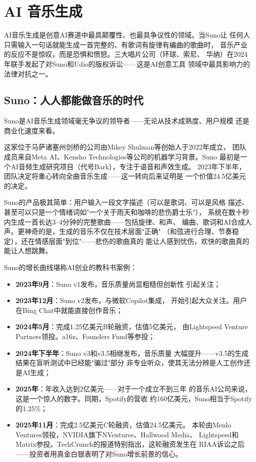 \section{AI 音乐生成}
\label{sec:create-music}

AI音乐生成是创意AI赛道中最具颠覆性、也最具争议性的领域。当Suno让
任何人只需输入一句话就能生成一首完整的、有歌词有旋律有编曲的歌曲时，
音乐产业的反应不是惊叹，而是恐惧和愤怒。三大唱片公司（环球、索尼、
华纳）在2024年联手发起了对Suno和Udio的版权诉讼——这是AI创意工具
领域中最具影响力的法律对抗之一。

\subsection{Suno：人人都能做音乐的时代}
\label{subsec:suno}

Suno是AI音乐生成领域毫无争议的领导者——无论从技术成熟度、用户规模
还是商业化速度来看。

这家位于马萨诸塞州剑桥的公司由Mikey Shulman等创始人于2022年成立，
团队成员来自Meta AI、Kensho Technologies等公司的机器学习背景。Suno
最初是一个AI音频生成研究项目（代号Bark），专注于语音和声效生成。
2023年下半年，团队决定将重心转向全曲音乐生成——这一转向后来证明是
一个价值24.5亿美元的决定。

Suno的产品极其简单：用户输入一段文字描述（可以是歌词、可以是风格
描述、甚至可以只是一个情绪词如"一个关于雨天和咖啡的悲伤爵士乐"），
系统在数十秒内生成一首长达3--4分钟的完整歌曲——包括旋律、和声、
编曲、歌词和AI合成人声。更神奇的是，生成的音乐不仅在技术层面"正确"
（和弦进行合理、节奏稳定），还在情感层面"到位"——悲伤的歌曲真的
能让人感到忧伤，欢快的歌曲真的能让人想跳舞。

Suno的增长曲线堪称AI创业的教科书案例：

\begin{itemize}
  \item \textbf{2023年9月}：Suno v1发布，音乐质量尚显粗糙但创新性
    引起关注；
  \item \textbf{2023年12月}：Suno v2发布，与微软Copilot集成，
    开始引起大众关注。用户在Bing Chat中就能直接创作音乐；
  \item \textbf{2024年5月}：完成1.25亿美元B轮融资，估值5亿美元，
    由Lightspeed Venture Partners领投。a16z、Founders Fund等参投；
  \item \textbf{2024年下半年}：Suno v3和v3.5相继发布，音乐质量
    大幅提升——v3.5的生成结果在盲听测试中已经能"骗过"部分
    非专业听众，使其无法分辨是人工创作还是AI生成；
  \item \textbf{2025年}：年收入达到2亿美元——对于一个成立不到三年
    的音乐AI公司来说，这是一个惊人的数字。同期，Spotify的营收
    约160亿美元，Suno相当于Spotify的1.25\%；
  \item \textbf{2025年11月}：完成2.5亿美元C轮融资，估值24.5亿美元。
    本轮由Menlo Ventures领投，NVIDIA旗下NVentures、Hallwood Media、
    Lightspeed和Matrix参投。TechCrunch的报道特别指出，这轮融资发生在
    RIAA诉讼之后——投资者用真金白银表明了对Suno增长前景的信心。
\end{itemize}

